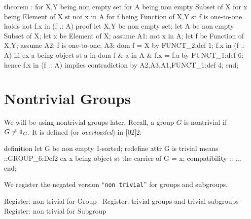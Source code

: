 \nwenddocs{}\endmoddef\nwstartdeflinemarkup{}\nwenddeflinemarkup
theorem :
  for X,Y being non empty set
  for A being non empty Subset of X
  for x being Element of X
  st not x in A
  for f being Function of X,Y
  st f is one-to-one
  holds not f.x in (f .: A)
proof
  let X,Y be non empty set;
  let A be non empty Subset of X;
  let x be Element of X;
  assume A1: not x in A;
  let f be Function of X,Y;
  assume A2: f is one-to-one;
  A3: dom f = X by FUNCT_2:def 1;
  f.x in (f .: A) iff ex a being object st a in dom f & a in A & f.x = f.a
  by FUNCT_1:def 6;
  hence f.x in (f .: A) implies contradiction by A2,A3,A1,FUNCT_1:def 4;
end;
\eatline
{}\nwendcode{}\nwdocspar



\section{Nontrivial Groups}
We will be using nontrivial groups later. Recall, a group $G$ is
nontrivial if $G\neq\mathbf{1}_{G}$. It is defined (or
\emph{overloaded}) in [02]{2}:

\begin{mizar}
definition
  let G be non empty 1-sorted;
  redefine attr G is trivial means
  ::GROUP_6:Def2
  ex x being object st the carrier of G = {x};
  compatibility
  :: ...
end;
\end{mizar}

We register the negated version ``\texttt{non trivial}'' for groups and
subgroups.

\nwenddocs{}\endmoddef\nwstartdeflinemarkup{}\nwenddeflinemarkup
\LA{}Register: non trivial for Group~{\nwtagstyle{}}\RA{}
\LA{}Register: trivial groups and trivial subgroups~{\nwtagstyle{}}\RA{}
\LA{}Register: non trivial for Subgroup~{\nwtagstyle{}}\RA{}

